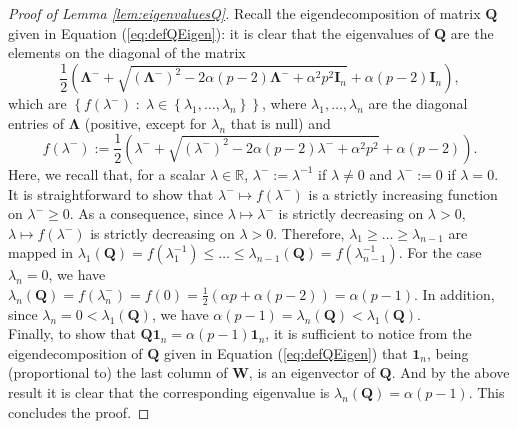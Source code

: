 \documentclass[12pt]{article}
\theoremstyle{plain}
\theoremstyle{remark}
\newcommand{\round}[1]{\left( #1 \right)}
\newcommand{\curly}[1]{\left\{ #1 \right\}}
\newcommand{\R}[0]{\mathbb{R}}
\newcommand{\onen}[0]{{\mathbf{1}_{n}}}
\newcommand{\latMatr}[1]{\mathbf{#1}}          %
\newcommand{\grMatr}[1]{{\boldsymbol{#1}}}   %
\newcommand{\tobi}[1]{\textcolor{teal}{#1}}
\begin{document}
    \begin{proof}[Proof of Lemma \ref{lem:eigenvaluesQ}]
        Recall the eigendecomposition of matrix $\latMatr Q$ given in Equation (\ref{eq:defQEigen}): it is clear that the eigenvalues of $\latMatr Q$ are the elements on the diagonal of the matrix 
        \begin{equation*}
            \frac{1}{2}\round{\grMatr{\Lambda}^-+\sqrt{(\grMatr{\Lambda}^{-})^2-2\alpha(p-2)\grMatr{\Lambda}^-+\alpha^2 p^2 \latMatr{I}_n}+\alpha(p-2)\latMatr{I}_n},
        \end{equation*}
        which are $\curly{f(\lambda^-)\;:\;\lambda\in \curly{\lambda_1,\dots,\lambda_n}}$, where  {$\lambda_1,\dots,\lambda_n$ are the diagonal entries of $\grMatr{\Lambda}$ (positive, except for $\lambda_n$ that is null) and}
        \begin{equation*}
            f(\lambda^-):=\frac{1}{2}\round{\lambda^-+\sqrt{\round{\lambda^-}^2-2\alpha(p-2)\lambda^-+\alpha^2 p^2}+\alpha(p-2)}.
        \end{equation*}
        Here, we recall that, for a scalar $\lambda\in\R$, $\lambda^-:=\lambda^{-1}$ if $\lambda \ne 0$ and $\lambda^-:=0$ if $\lambda=0$. It is straightforward to show that $\lambda^- \mapsto f(\lambda^-)$ is a strictly increasing function on $\lambda^- \geq 0$. As a consequence, since $\lambda \mapsto \lambda^-$ is strictly decreasing on $\lambda > 0$, $\lambda \mapsto f(\lambda^-)$ is strictly decreasing on $\lambda>0$. Therefore, $\lambda_1\geq\dots\geq \lambda_{n-1}$ are mapped in $\lambda_1(\latMatr Q)=f(\lambda_1^{-1})\leq\dots\leq \lambda_{n-1}(\latMatr Q)= f(\lambda_{n-1}^{-1})$. For the case $\lambda_n=0$, we have $\lambda_n(\latMatr Q)=f(\lambda_n^-)=f(0)=\frac{1}{2}\round{\alpha p + \alpha(p-2)}=\alpha(p-1)$. In addition, since $\lambda_n=0<\lambda_1(\latMatr Q)$, we have $\alpha(p-1) = \lambda_n(\latMatr Q) < \lambda_1(\latMatr Q)$. \\
        Finally, to show that $\latMatr Q \onen = \alpha(p-1) \onen$, it is sufficient to notice from the eigendecomposition of $\latMatr Q$ given in Equation (\ref{eq:defQEigen}) that $\onen$, being (proportional to) the last column of $\latMatr W$, is an eigenvector of $\latMatr Q$. And by the above result it is clear that the corresponding eigenvalue is $\lambda_n(\latMatr Q)=\alpha(p-1)$. This concludes the proof.
    \end{proof}
    
\end{document}
